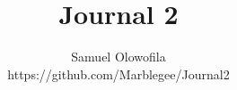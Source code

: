 \documentclass[12pt]{article}
\begin{document}
\title{Journal 2}
\author{Samuel Olowofila \\
https://github.com/Marblegee/Journal2}
\date{}
\maketitle





\nocite{*}
\printbibliography


\nocite{*}
\printbibliography[heading=none]
\end{document}
